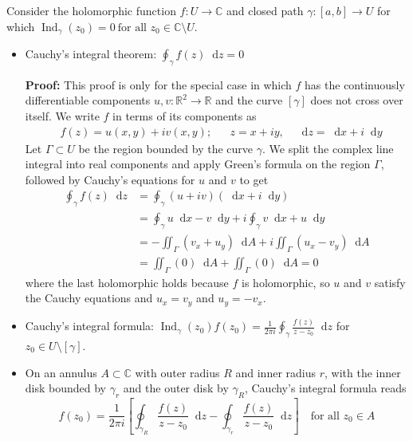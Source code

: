 \documentclass[11pt, a4paper]{article}
\newcommand{\R}{\mathbb{R}} %
\newcommand{\C}{\mathbb{C}} %
\newcommand{\diff}{\mathop{}\!\mathrm{d}} %
\begin{document}
Consider the holomorphic function $ f: U \to \C $ and closed path $ \gamma : [a, b] \to U $ for which $	\operatorname{Ind}_{\gamma}(z_0) = 0 \ \text{for all } z_0 \in \C \setminus U $.
\begin{itemize}
	\item Cauchy's integral theorem: $ \displaystyle{\oint_{\gamma} f(z) \diff z = 0} $
	
	\vspace{2mm}
	\textbf{Proof:} This proof is only for the special case in which $ f $ has the continuously differentiable components $ u, v: \R^2 \to \R $ and the curve $ [\gamma] $ does not cross over itself. We write $ f $ in terms of its components as
	\begin{align*}
		&f(z) = u(x, y) + iv(x, y); && z = x + iy, \quad \diff z = \diff x + i \diff y
	\end{align*}
	Let $ \Gamma \subset U $ be the region bounded by the curve $ \gamma $. We split the complex line integral into real components and apply Green's formula on the region $ \Gamma $, followed by Cauchy's equations for $ u $ and $ v $ to get
	\begin{align*}
		\oint_{\gamma} f(z) \diff z &= \oint_{\gamma}(u + iv)(\diff x + i \diff y)\\
		&= \oint_{\gamma} u \diff x - v \diff y + i\oint_{\gamma} v \diff x + u \diff y\\
		&=-\iint_{\Gamma} (v_x + u_y) \diff A + i\iint_{\Gamma} (u_x - v_y) \diff A\\
		&=\iint_{\Gamma} (0) \diff A + \iint_{\Gamma} (0) \diff A = 0
	\end{align*}
	where the last holomorphic holds because $ f $ is holomorphic, so $ u $ and $ v $ satisfy the Cauchy equations and $ u_x = v_y $ and $ u_y = -v_x $. 
	
	\item Cauchy's integral formula: $ \displaystyle{\operatorname{Ind}_{\gamma}(z_0) f(z_0) = \frac{1}{2\pi i} \oint_{\gamma} \frac{f(z)}{z - z_0} \diff z} $ for $ z_0 \in U \setminus [\gamma] $.
	
	\item On an annulus $ A \subset \C $ with outer radius $ R $ and inner radius $ r $, with the inner disk bounded by $ \gamma_r $ and the outer disk by $ \gamma_R $,  Cauchy's integral formula reads
	\begin{equation*}
		f(z_0) = \frac{1}{2\pi i} \left[\oint_{\gamma_R} \frac{f(z)}{z - z_0} \diff z - \oint_{\gamma_r} \frac{f(z)}{z - z_0} \diff z \right] \quad \text{for all } z_{0} \in A
	\end{equation*}
	
\end{itemize}
\end{document}
